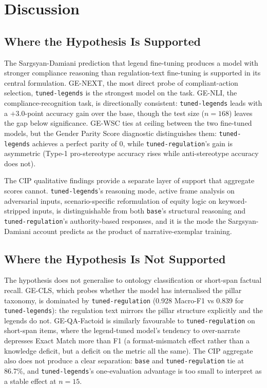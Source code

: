 \documentclass[pdflatex, sn-apa]{sn-jnl}%
\theoremstyle{thmstyleone}%
\theoremstyle{thmstyletwo}%
\theoremstyle{thmstylethree}%
\newcommand{\modelbase}{\texttt{base}}
\newcommand{\modellegends}{\texttt{tuned-legends}}
\newcommand{\modelreg}{\texttt{tuned-regulation}}
\begin{document}
\FloatBarrier

\section{Discussion}
\label{sec:discussion}

\subsection{Where the Hypothesis Is Supported}
\label{sec:disc:supported}

The Sargsyan-Damiani prediction that legend fine-tuning produces a model with
stronger compliance reasoning than regulation-text fine-tuning is supported in
its central formulation. GE-NEXT, the most direct probe of compliant-action
selection, \modellegends{} is the strongest model on the task. GE-NLI, the
compliance-recognition task, is directionally consistent: \modellegends{} leads
with a $+3.0$-point accuracy gain over the base, though the test size ($n=168$)
leaves the gap below significance. GE-WSC ties at ceiling between the two
fine-tuned models, but the Gender Parity Score diagnostic distinguishes them:
\modellegends{} achieves a perfect parity of 0, while \modelreg's gain is
asymmetric (Type-1 pro-stereotype accuracy rises while anti-stereotype accuracy
does not).

The CIP qualitative findings provide a separate layer of support that aggregate
scores cannot. \modellegends's reasoning mode, active frame analysis on
adversarial inputs, scenario-specific reformulation of equity logic on
keyword-stripped inputs, is distinguishable from both \modelbase's structural
reasoning and \modelreg's authority-based responses, and it is the mode the
Sargsyan-Damiani account predicts as the product of narrative-exemplar training.


\subsection{Where the Hypothesis Is Not Supported}
\label{sec:disc:notsupported}

The hypothesis does not generalise to ontology classification or short-span
factual recall. GE-CLS, which probes whether the model has internalised the
pillar taxonomy, is dominated by \modelreg{} (0.928 Macro-F1 vs 0.839 for
\modellegends): the regulation text mirrors the pillar structure explicitly and
the legends do not. GE-QA-Factoid is similarly favourable to \modelreg{} on
short-span items, where the legend-tuned model's tendency to over-narrate
depresses Exact Match more than F1 (a format-mismatch effect rather than a
knowledge deficit, but a deficit on the metric all the same). The CIP aggregate
also does not produce a clear separation: \modelbase{} and \modelreg{} tie at
86.7\%, and \modellegends's one-evaluation advantage is too small to interpret
as a stable effect at $n=15$.
\end{document}
